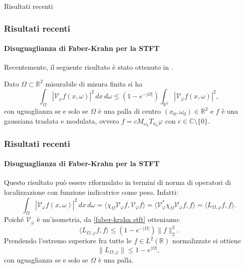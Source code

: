 \documentclass[aspectratio=141]{beamer}
\newcommand{\R}{\mathbb{R}} %
\newcommand{\V}{\mathcal{V}} %
\newcommand{\C}{\mathbb{C}} %
\begin{document}
\begin{section}{Risultati recenti}
	
	\begin{frame}
		\frametitle{Risultati recenti}
		\framesubtitle{Disuguaglianza di Faber-Krahn per la STFT}
		Recentemente, il seguente risultato è stato ottenuto in \cite{nicolatilli_fk}.
		\begin{myblock}
			Dato $\Omega \subset \R^2$ misurabile di misura finita si ha
			\begin{equation}\label{faber-krahn stft}
				\int_{\Omega} |\V_{\varphi} f (x, \omega)|^2 \, dx \, d\omega \leq ( 1 - e^{-|\Omega|}) \int_{\R^2} |\V_{\varphi} f (x, \omega)|^2,
			\end{equation}
			con uguaglianza se e solo se $\Omega$ è una palla di centro $(x_0, \omega_0) \in \R^2$ e $f$ è una gaussiana traslata e modulata, ovvero $f = c M_{\omega_0} T_{x_0} \varphi$ con $c \in \C \setminus \{0\}$.
		\end{myblock}
	\end{frame}

	\begin{frame}
		\frametitle{Risultati recenti}
		\framesubtitle{Disuguaglianza di Faber-Krahn per la STFT}
		Questo risultato può essere riformulato in termini di norma di  operatori di localizzazione con funzione indicatrice come peso. Infatti:
		\begin{equation*}
			\int_{\Omega} |\V_{\varphi} f (x, \omega)|^2 \, dx \, d\omega = \langle \chi_{\Omega} \V_{\varphi} f, \V_{\varphi} f \rangle = \langle \V_{\varphi}^* \chi_{\Omega} \V_{\varphi} f, f \rangle = \langle L_{\Omega, \varphi} f, f \rangle.
		\end{equation*}
		\pause
		Poiché $\V_{\varphi}$ è un'isometria, da \eqref{faber-krahn stft} otteniamo:
		\begin{equation*}
			\langle L_{\Omega, \varphi} f, f \rangle \leq (1-e^{-|\Omega|}) \|f\|_2^2.
		\end{equation*}
		Prendendo l'estremo superiore fra tutte le $f \in L^2(\R)$ normalizzate si ottiene
		\begin{equation*}
			\|L_{\Omega, \varphi} \| \leq 1 - e^{|\Omega|},
		\end{equation*}
		con uguaglianza se e solo se $\Omega$ è una palla.
	\end{frame}
	

\end{section}
\end{document}
